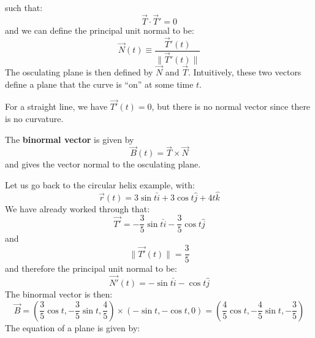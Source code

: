 \begin{itemize}
    such that:
    \begin{equation}
        \vec{T} \cdot \vec{T}' = 0
    \end{equation}
    and we can define the principal unit normal to be:
    \begin{equation}
        \vec{N}(t) \equiv \frac{\vec{T}'(t)}{\lVert \vec{T}'(t) \rVert}
    \end{equation}
    The osculating plane is then defined by $\vec{N}$ and $\vec{T}$. Intuitively, these two vectors define a plane that the curve is ``on'' at some time $t$.
    \begin{example}
        For a straight line, we have $\vec{T'}(t)=0$, but there is no normal vector since there is no curvature.
    \end{example}
    \begin{definition}
        The \textbf{binormal vector} is given by 
        \begin{equation}
            \vec{B}(t) = \vec{T} \times \vec{N}
        \end{equation}
        and gives the vector normal to the osculating plane.
    \end{definition}
    \begin{example}
        Let us go back to the circular helix example, with:
        \begin{equation}
            \vec{r}(t) = 3\sin t \hat{i} + 3\cos t\hat{j} + 4t\hat{k}
        \end{equation}
        We have already worked through that:
        \begin{equation}
            \vec{T'} = - \frac{3}{5}\sin t \hat{i} - \frac{3}{5}\cos t\hat{j}
        \end{equation}
        and
        \begin{equation}
            \lVert \vec{T'}(t) \rVert = \frac{3}{5}
        \end{equation}
        and therefore the principal unit normal to be:
        \begin{equation}
            \vec{N'}(t) = -\sin t \hat{i} - \cos t \hat{j}
        \end{equation}
        The binormal vector is then:
        \begin{equation}
            \vec{B} = \left(\frac{3}{5}\cos t, -\frac{3}{5}\sin t, \frac{4}{5}\right) \times (-\sin t, -\cos t, 0) = \left(\frac{4}{5}\cos t, -\frac{4}{5}\sin t, -\frac{3}{5}\right)
        \end{equation}
        The equation of a plane is given by:

\end{example}
\end{itemize}
